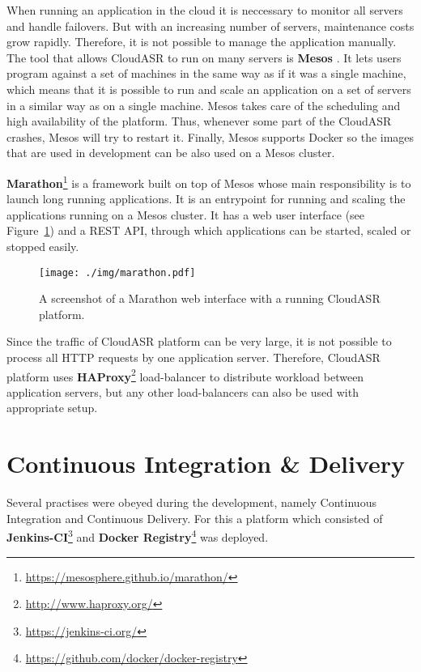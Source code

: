 When running an application in the cloud it is neccessary to monitor all servers and handle failovers.
But with an increasing number of servers, maintenance costs grow rapidly.
Therefore, it is not possible to manage the application manually.
The tool that allows CloudASR to run on many servers is \textbf{Mesos} \cite{hindman2011mesos}.
It lets users program against a set of machines in the same way as if it was a single machine,
  which means that it is possible to run and scale an application on a set of servers in a similar way as on a single machine.
Mesos takes care of the scheduling and high availability of the platform.
Thus, whenever some part of the CloudASR crashes, Mesos will try to restart it.
Finally, Mesos supports Docker so the images that are used in development can be also used on a Mesos cluster.

\textbf{Marathon}\footnote{\url{https://mesosphere.github.io/marathon/}} is a framework built on top of Mesos whose main responsibility is to launch long running applications.
It is an entrypoint for running and scaling the applications running on a Mesos cluster.
It has a web user interface (see Figure~\ref{fig:marathon}) and a REST API,
  through which applications can be started, scaled or stopped easily.

\begin{figure}
  \centering
  \texttt{[image: ./img/marathon.pdf]}

  \caption{
    A screenshot of a Marathon web interface with a running CloudASR platform.
  }
  \label{fig:marathon}
\end{figure}

Since the traffic of CloudASR platform can be very large,
  it is not possible to process all HTTP requests by one application server.
Therefore, CloudASR platform uses \textbf{HAProxy}\footnote{\url{http://www.haproxy.org/}} load-balancer to distribute workload between application servers,
  but any other load-balancers can also be used with appropriate setup.



\section{Continuous Integration \& Delivery}
Several practises were obeyed during the development,
  namely Continuous Integration and Continuous Delivery.
For this a platform which consisted of \textbf{Jenkins-CI}\footnote{\url{https://jenkins-ci.org/}} and \textbf{Docker Registry}\footnote{\url{https://github.com/docker/docker-registry}} was deployed.

